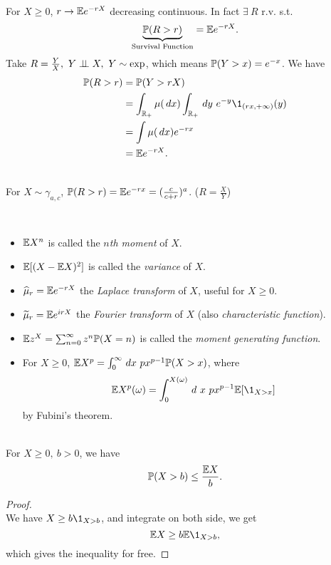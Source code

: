 \begin{example}\ \\
For $X \geq 0$, $r \to \E e^{-r X}$ decreasing continuous. In fact $\exists\ R$ r.v. s.t. 
\begin{equation*}
    \underbrace{\P(R > r)}_{\text{Survival Function}} = \E e^{-r X}.
\end{equation*}
Take $R = \frac{Y}{X},\ Y \indep X,\ Y \sim \exp$, which means $\P(Y > x) = e^{-x}$. We have
\begin{align*}
    \P(R > r) &= \P(Y > rX)\\
    &= \int_{\R_+} \mu(\dr x) \int_{\R_+}\dr y\ e^{-y} \1_{(rx,+\infty)}(y)\\
    &= \int \mu(\dr x) e^{-rx}\\
    &= \E e^{-r X}.
\end{align*}
\end{example}

\begin{example}\ \\
For $X \sim \gamma_{a,c}$, $\P(R > r) = \E e^{-rx} = (\frac{c}{c + r})^a$. ($R = \frac{X}{Y}$)
\end{example}

 
\begin{definition}\ 
\begin{itemize}
    \item $\E X^n$ is called the \textit{$n$th moment} of $X$.
    \item $\E[(X - \E X)^2]$ is called the \textit{variance} of $X$.
    \item $\hat{\mu}_r = \E e^{-rX}$ the \textit{Laplace transform} of $X$, useful for $X \geq 0$.
    \item $\widetilde{\mu}_r = \E e^{irX}$ the \textit{Fourier transform} of $X$ (also \textit{characteristic function}).
    \item $\E z^X = \sum_{n = 0}^\infty z^n \P(X = n)$ is called the \textit{moment generating function}.
    \item For $X \geq 0$, $\E X^p = \int_0^\infty \dr x\ p x^{p-1} \P(X > x)$, where
    \begin{equation*}
        \E X^p(\omega) = \int_0^{X(\omega)} \dr\ x\ p x^{p-1} \E[\1_{X > x}]
    \end{equation*}
    by Fubini's theorem.
\end{itemize}
\end{definition}

\begin{proposition}\ \\
For $X \geq 0,\ b > 0$, we have
\begin{equation*}
    \P(X > b) \leq \frac{\E X}{b}.
\end{equation*}
\end{proposition}
\begin{proof}\ \\
We have $X \geq b \1_{X > b}$, and integrate on both side, we get
\begin{equation*}
    \E X \geq b \E \1_{X > b},
\end{equation*}
which gives the inequality for free.
\end{proof}

